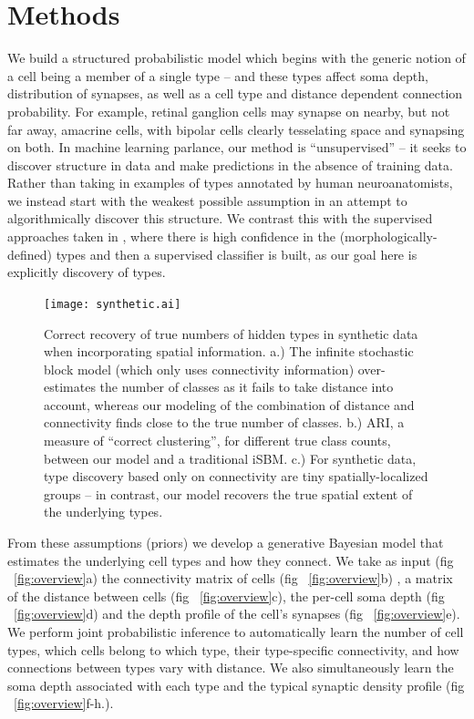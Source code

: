 \documentclass{article}
\begin{document}
\section*{Methods}


We build a structured probabilistic model which begins with the
generic notion of a cell being a member of a single type -- and these
types affect soma depth, distribution of synapses, as well as a cell
type and distance dependent connection probability. For example,
retinal ganglion cells may synapse on nearby, but not far away,
amacrine cells, with bipolar cells clearly tesselating space and
synapsing on both. In machine learning parlance, our method is
“unsupervised” -- it seeks to discover structure in data and make
predictions in the absence of training data. Rather than taking in
examples of types annotated by human neuroanatomists, we instead start
with the weakest possible assumption in an attempt to algorithmically
discover this structure. We contrast this with the supervised
approaches taken in \autocite{Guerra2011}, where there is high
confidence in the (morphologically-defined) types and then a
supervised classifier is built, as our goal here is explicitly
discovery of types.

\begin{figure}
  \centering 
  \centerline{\texttt{[image: synthetic.ai]}}
  \caption{Correct recovery of true numbers of hidden types in
    synthetic data when incorporating spatial information. a.) The
    infinite stochastic block model (which only uses connectivity
    information) over-estimates the number of classes as it fails to
    take distance into account, whereas our modeling of the
    combination of distance and connectivity finds close to the true
    number of classes. b.) ARI, a measure of ``correct clustering'',
    for different true class counts, between our model and a
    traditional iSBM. c.) For synthetic data, type discovery based
    only on connectivity are tiny spatially-localized groups -- in
    contrast, our model recovers the true spatial extent of the
    underlying types.  }
\label{fig:synthetic}
\end{figure}

From these assumptions (priors) we develop a generative Bayesian model
that estimates the underlying cell types and how they connect. We take
as input (fig ~\ref{fig:overview}a) the connectivity matrix of cells
(fig ~\ref{fig:overview}b) , a matrix of the distance between cells
(fig ~\ref{fig:overview}c), the per-cell soma depth (fig
~\ref{fig:overview}d) and the depth profile of the cell's synapses
(fig ~\ref{fig:overview}e). We perform joint probabilistic inference
to automatically learn the number of cell types, which cells belong to
which type, their type-specific connectivity, and how connections
between types vary with distance. We also simultaneously learn the
soma depth associated with each type and the typical synaptic density
profile (fig ~\ref{fig:overview}f-h.).
\end{document}
